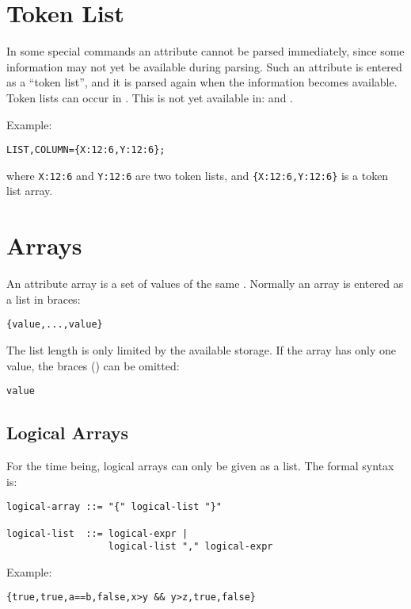 \section{Token List}
\label{sec:toklist}
In some special commands  an attribute
cannot be parsed immediately, since some information may not yet be
available during parsing.
Such an attribute is entered as a ``token list'', and it is parsed
again when the information becomes available.
Token lists can occur in .
This is not yet available in: 
\noopalt and \noopalcycl.

\noindent Example:
\begin{verbatim}
LIST,COLUMN={X:12:6,Y:12:6};
\end{verbatim}
where \texttt{X:12:6} and \texttt{Y:12:6} are two token lists,
and \texttt{\{X:12:6,Y:12:6\}} is a token list array.

\section{Arrays}
\label{sec:anarray}
An attribute array is a set of values of the same 
.
Normally an array is entered as a list in braces:
\begin{verbatim}
{value,...,value}
\end{verbatim}
The list length is only limited by the available storage.
If the array has only one value, the braces (\texttt{{}}) can be omitted:
\begin{verbatim}
value
\end{verbatim}

\subsection{Logical Arrays}
\label{sec:logarray}
For the time being, logical arrays can only be given as a list.
The formal syntax is:
\begin{verbatim}
logical-array ::= "{" logical-list "}"

logical-list  ::= logical-expr |
                  logical-list "," logical-expr
\end{verbatim}
\par
\noindent Example:
\begin{verbatim}
{true,true,a==b,false,x>y && y>z,true,false}
\end{verbatim}

